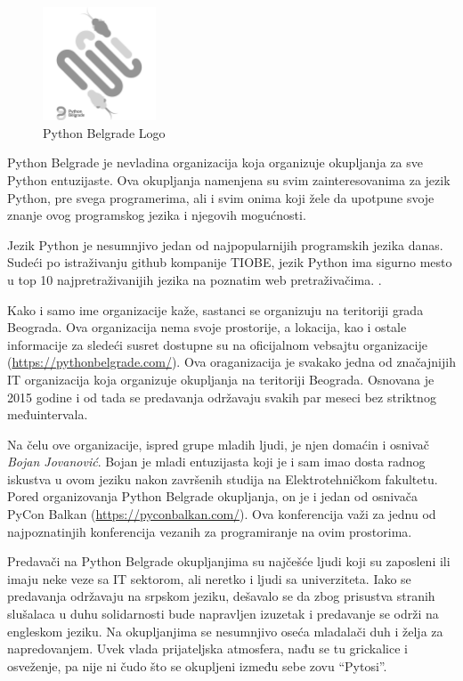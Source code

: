 \documentclass[a4paper]{article}
\begin{document}
{\begin{figure}[h]
  \centering
  \includegraphics[width=0.3\textwidth]{pybgd.png}
  \caption{Python Belgrade Logo}
\end{figure}

Python Belgrade je nevladina organizacija koja organizuje okupljanja za sve Python entuzijaste. Ova okupljanja namenjena su svim
zainteresovanima za jezik Python, pre svega programerima, ali i svim onima koji žele da upotpune svoje znanje ovog programskog jezika i njegovih mogućnosti.

Jezik Python je nesumnjivo jedan od najpopularnijih programskih jezika danas. Sudeći po istraživanju github kompanije TIOBE, jezik Python ima sigurno mesto u top 10 najpretraživanijih jezika na poznatim web pretraživačima. \cite{pythonPopular}.

Kako i samo ime organizacije kaže, sastanci se organizuju na teritoriji grada Beograda. Ova organizacija nema svoje prostorije, a lokacija, kao i ostale informacije
za sledeći susret dostupne su na oficijalnom vebsajtu organizacije (\url{https://pythonbelgrade.com/}). Ova oraganizacija je svakako jedna od značajnijih IT organizacija koja organizuje okupljanja na teritoriji Beograda. Osnovana je 2015 godine i od tada se predavanja održavaju svakih par meseci bez striktnog međuintervala. 

Na čelu ove organizacije, ispred grupe mladih ljudi, je njen domaćin i osnivač \textit{Bojan Jovanović}. Bojan je mladi entuzijasta koji je i sam imao dosta radnog iskustva u ovom jeziku nakon završenih studija na
Elektrotehničkom fakultetu. Pored organizovanja Python Belgrade okupljanja, on je i jedan od osnivača PyCon Balkan (\url{https://pyconbalkan.com/}). Ova konferencija važi za jednu od najpoznatinjih konferencija vezanih za programiranje na ovim prostorima.

Predavači na Python Belgrade okupljanjima su najčešće ljudi koji su zaposleni ili imaju neke veze sa IT sektorom, ali neretko i ljudi sa univerziteta. \cite{pybgdSpeakers} Iako se predavanja održavaju na srpskom jeziku, dešavalo se da zbog prisustva stranih slušalaca u duhu solidarnosti bude napravljen izuzetak i predavanje se održi na engleskom jeziku. Na okupljanjima se nesumnjivo oseća mladalači duh i želja za napredovanjem. Uvek vlada prijateljska atmosfera, nađu se tu grickalice i osveženje, pa nije ni čudo što se okupljeni između sebe zovu ``Pytosi''.

}
\end{document}
